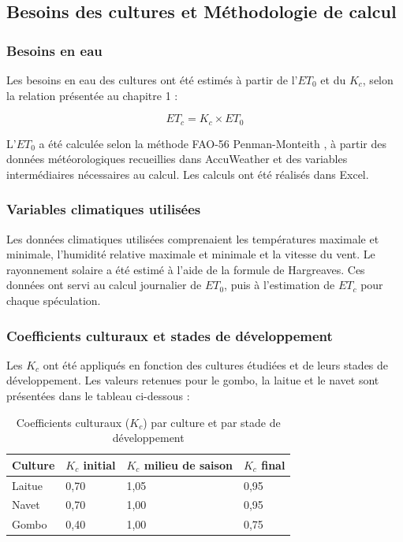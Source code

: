 \subsection{Besoins des cultures et Méthodologie de calcul}
\subsubsection{Besoins en eau}
Les besoins en eau des cultures ont été estimés à partir de l’$ET_0$ et du $K_c$, selon la relation présentée au chapitre 1 : 

\begin{equation}
    ET_c = K_c \times ET_0
    \label{eq:etc2}
\end{equation}

L’$ET_0$ a été calculée selon la méthode FAO-56 Penman-Monteith \cite{allen_crop_1998-1}, à partir des données météorologiques recueillies dans AccuWeather et des variables intermédiaires nécessaires au calcul. Les calculs ont été réalisés dans Excel.


\subsubsection{Variables climatiques utilisées}
Les données climatiques utilisées comprenaient les températures maximale et minimale, l’humidité relative maximale et minimale et la vitesse du vent. 
Le rayonnement solaire a été estimé à l’aide de la formule de Hargreaves. Ces données ont servi au calcul journalier de $ET_0$, puis à l’estimation de $ET_c$ pour chaque spéculation.


\subsubsection{Coefficients culturaux et stades de développement}
Les $K_c$ ont été appliqués en fonction des cultures étudiées et de leurs stades de développement. Les valeurs retenues pour le gombo, la laitue et le navet sont présentées dans le tableau ci-dessous : 

\begin{table}[H]
    \centering
    \caption{Coefficients culturaux ($K_c$) par culture et par stade de développement}
    \label{tab:coefficients_kc}
    \begin{tabular}{|p{3cm}|p{3cm}|p{4cm}|p{3cm}|}
        \hline
        \textbf{Culture} & \textbf{$K_c$ initial} & \textbf{$K_c$ milieu de saison} & \textbf{$K_c$ final} \\
        \hline
        Laitue & 0,70 & 1,05 & 0,95 \\
        \hline
        Navet & 0,70 & 1,00 & 0,95 \\
        \hline
        Gombo & 0,40 & 1,00 & 0,75 \\
        \hline
    \end{tabular}
\end{table}

